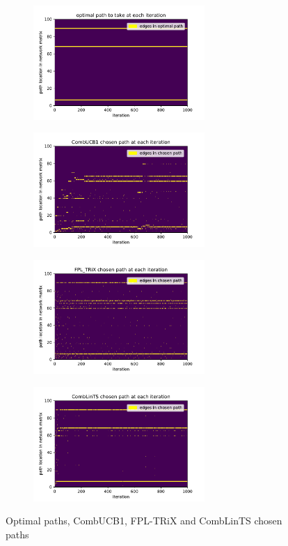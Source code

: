 \begin{figure}[ht!]
\centering
\begin{subfigure}{.49\textwidth}
  \centering
  \includegraphics[width=65mm]{../plots/stoch_network_opt_paths.pdf}
\end{subfigure}%
\begin{subfigure}{.49\textwidth}
  \centering
  \includegraphics[width=65mm]{../plots/stoch_network_UCB1.pdf}
\end{subfigure}
\begin{subfigure}{.49\textwidth}
  \centering
  \includegraphics[width=65mm]{../plots/stoch_network_FPL.pdf}
\end{subfigure}
\begin{subfigure}{.49\textwidth}
  \centering
  \includegraphics[width=65mm]{../plots/stoch_network_CombLinTS.pdf}
\end{subfigure}
\caption{Optimal paths, CombUCB1, FPL-TRiX and CombLinTS chosen paths}
\label{fig:stochastic_network}
\end{figure}


